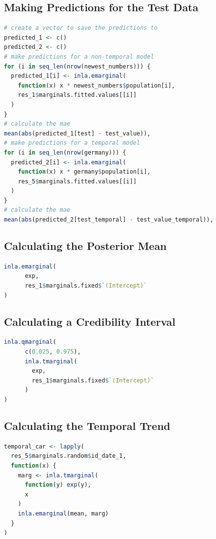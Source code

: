 \subsection{Making Predictions for the Test Data}
\begin{lstlisting}[caption={The code for making predictions in INLA.}, label={codePrediction}, language=R]
# create a vector to save the predictions to
predicted_1 <- c()
predicted_2 <- c()
# make predictions for a non-temporal model
for (i in seq_len(nrow(newest_numbers))) {
  predicted_1[i] <- inla.emarginal(
    function(x) x * newest_numbers$population[i],
    res_1$marginals.fitted.values[[i]]
  )
}
# calculate the mae
mean(abs(predicted_1[test] - test_value)),
# make predictions for a temporal model
for (i in seq_len(nrow(germany))) {
  predicted_2[i] <- inla.emarginal(
    function(x) x * germany$population[i],
    res_5$marginals.fitted.values[[i]]
  )
}
# calculate the mae
mean(abs(predicted_2[test_temporal] - test_value_temporal)),
\end{lstlisting}
\subsection{Calculating the Posterior Mean}
\begin{lstlisting}[caption={Calculating the posterior mean of a coefficent.}, label={codePosteriorMean}, language=R]
inla.emarginal(
      exp,
      res_1$marginals.fixed$`(Intercept)`
)
\end{lstlisting}
\subsection{Calculating a Credibility Interval}
\begin{lstlisting}[caption={Extracting the credibility interval for a coefficient}, label={codeCredibility}, language=R]
inla.qmarginal(
      c(0.025, 0.975),
      inla.tmarginal(
        exp,
        res_1$marginals.fixed$`(Intercept)`
      )
)
\end{lstlisting}
\subsection{Calculating the Temporal Trend}
\begin{lstlisting}[caption={Calculating the Temporal Trend of a Model}, label={codeTemporal}, language=R]
temporal_car <- lapply(
  res_5$marginals.random$id_date_1,
  function(x) {
    marg <- inla.tmarginal(
      function(y) exp(y),
      x
    )
    inla.emarginal(mean, marg)
  }
)
\end{lstlisting}
\clearpage